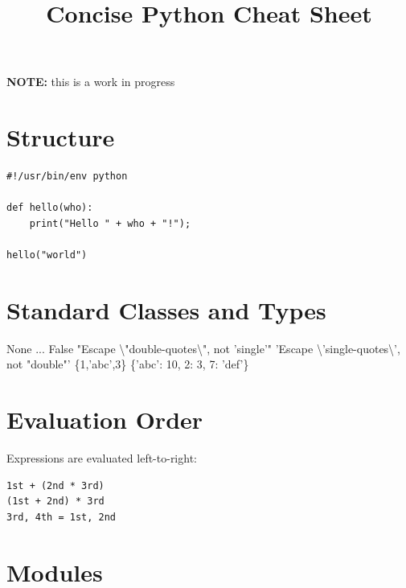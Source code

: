 \documentclass{refcard}
\title{Concise Python Cheat Sheet}
\begin{document}
\maketitle

\begin{center}
{\Large\textbf{NOTE:} this is a work in progress}
\end{center}

\section{Structure}

\begin{verbatim}
#!/usr/bin/env python

def hello(who):
    print("Hello " + who + "!");

hello("world")
\end{verbatim}





\section{Standard Classes and Types}


\begin{ldesc}
	\li[\C{NoneType}]  None
	\li[\C{ellipsis}]  ...
	\li[\C{bool}]      False
	\li[\C{str}]       "Escape \textbackslash{}"double-quotes\textbackslash{}", not 'single'"
	\li[\C{str}]       'Escape \textbackslash{}'single-quotes\textbackslash{}', not "double"'
	\li[\C{list}]      [360,'abc',3.141,360]
	\li[\C{set}]       \{1,'abc',3\}
	\li[\C{dict}]      \{'abc': 10, 2: 3, 7: 'def'\}
\end{ldesc}

\section{Evaluation Order}

Expressions are evaluated left-to-right:
\begin{verbatim}
1st + (2nd * 3rd)
(1st + 2nd) * 3rd
3rd, 4th = 1st, 2nd
\end{verbatim}

\section{Modules}
\end{document}

